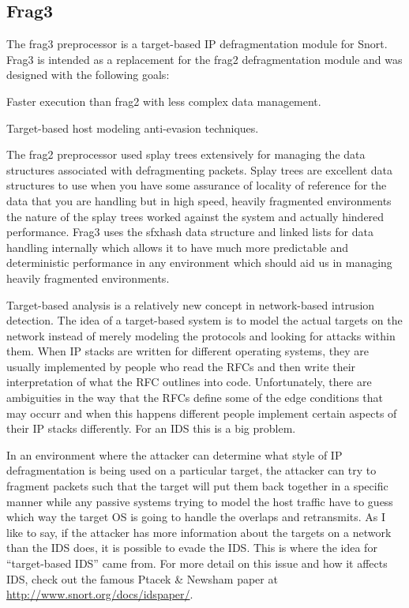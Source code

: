 \documentclass[english]{report}
\newcounter{slistnum}
\newenvironment{slist}
{ \begin{list}{ {\bf \arabic{slistnum}.} }{\usecounter{slistnum} } }
{ \end{list} }
\begin{document}
\subsection{Frag3 \label{frag3 section}}

The frag3 preprocessor is a target-based IP defragmentation module for Snort.
Frag3 is intended as a replacement for the frag2 defragmentation module and 
was designed with the following goals:
\begin{slist}
\item Faster execution than frag2 with less complex data management.
\item Target-based host modeling anti-evasion techniques.
\end{slist}

The frag2 preprocessor used splay trees extensively for managing the data 
structures associated with defragmenting packets.  Splay trees are excellent 
data structures to use when you have some assurance of locality of reference
for the data that you are handling but in high speed, heavily fragmented 
environments the nature of the splay trees worked against the system and 
actually hindered performance.  Frag3 uses the sfxhash data structure and 
linked lists for data handling internally which allows it to have much more
predictable and deterministic performance in any environment which should 
aid us in managing heavily fragmented environments.

Target-based analysis is a relatively new concept in network-based intrusion
detection.  The idea of a target-based system is to model the actual targets
on the network instead of merely modeling the protocols and looking for 
attacks within them.  When IP stacks are written for different operating 
systems, they are usually implemented by people who read the RFCs and then
write their interpretation of what the RFC outlines into code.  Unfortunately, there
are ambiguities in the way that the RFCs define some of the edge conditions 
that may occurr and when this happens different people implement certain aspects
of their IP stacks differently.  For an IDS this is a big problem.

In an environment where the attacker can determine what style of IP 
defragmentation is being used on a particular target, the attacker can try to
fragment packets such that the target will put them back together in a 
specific manner while any passive systems trying to model the host traffic 
have to guess which way the target OS is going to handle the overlaps and 
retransmits.  As I like to say, if the attacker has more information about the
targets on a network than the IDS does, it is possible to evade the IDS.  This
is where the idea for ``target-based IDS'' came from.  For more detail on this
issue and how it affects IDS, check out the famous Ptacek \& Newsham paper at
\url{http://www.snort.org/docs/idspaper/}.
\end{document}
